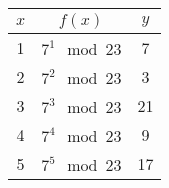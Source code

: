 \documentclass[preview,varwidth ,multi]{standalone}
\begin{document}
\renewcommand{\arraystretch}{1.5}

\preview
\begin{tabular}{ c|c|c }
 $x$ & $f(x)$ & $y$ \\
\hline
1 & $7^1 \mod 23$ & 7 \\
2 & $7^2 \mod 23$ & 3 \\
3 & $7^3 \mod 23$ & 21 \\
4 & $7^4 \mod 23$ & 9 \\
5 & $7^5 \mod 23$ & 17 
\end{tabular}
\endpreview
\end{document}
